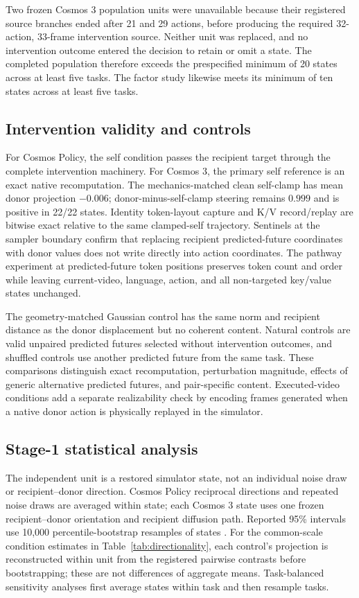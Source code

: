 \documentclass{article}
\begin{document}
Two frozen Cosmos 3 population units were unavailable because their registered source branches ended after 21 and 29 actions, before producing the required 32-action, 33-frame intervention source. Neither unit was replaced, and no intervention outcome entered the decision to retain or omit a state. The completed population therefore exceeds the prespecified minimum of 20 states across at least five tasks. The factor study likewise meets its minimum of ten states across at least five tasks.

\subsection{Intervention validity and controls}
\label{app:controls}

For Cosmos Policy, the self condition passes the recipient target through the complete intervention machinery. For Cosmos 3, the primary self reference is an exact native recomputation. The mechanics-matched clean self-clamp has mean donor projection $-0.006$; donor-minus-self-clamp steering remains $0.999$ and is positive in 22/22 states. Identity token-layout capture and K/V record/replay are bitwise exact relative to the same clamped-self trajectory. Sentinels at the sampler boundary confirm that replacing recipient predicted-future coordinates with donor values does not write directly into action coordinates. The pathway experiment at predicted-future token positions preserves token count and order while leaving current-video, language, action, and all non-targeted key/value states unchanged.

The geometry-matched Gaussian control has the same norm and recipient distance as the donor displacement but no coherent content. Natural controls are valid unpaired predicted futures selected without intervention outcomes, and shuffled controls use another predicted future from the same task. These comparisons distinguish exact recomputation, perturbation magnitude, effects of generic alternative predicted futures, and pair-specific content. Executed-video conditions add a separate realizability check by encoding frames generated when a native donor action is physically replayed in the simulator.

\subsection{Stage-1 statistical analysis}
\label{app:stage1_stats}

The independent unit is a restored simulator state, not an individual noise draw or recipient--donor direction. Cosmos Policy reciprocal directions and repeated noise draws are averaged within state; each Cosmos 3 state uses one frozen recipient--donor orientation and recipient diffusion path. Reported 95\% intervals use 10,000 percentile-bootstrap resamples of states \citep{field2007clusterbootstrap}. For the common-scale condition estimates in Table~\ref{tab:directionality}, each control's projection is reconstructed within unit from the registered pairwise contrasts before bootstrapping; these are not differences of aggregate means. Task-balanced sensitivity analyses first average states within task and then resample tasks.
\end{document}

